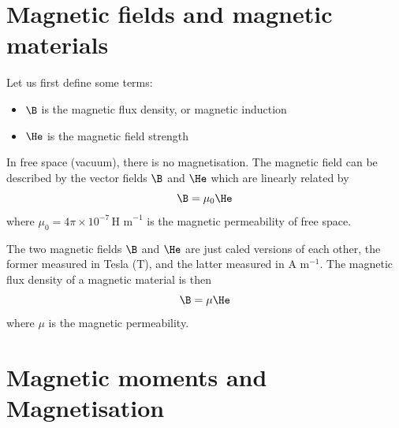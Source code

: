 \documentclass[a4paper, 11pt, normalem]{report}
\begin{document}
\section{Magnetic fields and magnetic materials}
Let us first define some terms:
\begin{itemize}
    \item $\B$ is the magnetic flux density, or magnetic induction
    \item $\He$ is the magnetic field strength
\end{itemize}
In free space (vacuum), there is no magnetisation. 
The magnetic field can be described by the vector fields $\B$ and $\He$ which are linearly related by 
\begin{equation}
    \B = \mu_0 \He
\end{equation}
where $\mu_0 = 4\pi\times10^{-7}\,\text{H m}^{-1}$ is the magnetic permeability of free space.

The two magnetic fields $\B$ and $\He$ are just caled versions of each other, the former measured in Tesla (T), and the latter measured in A m$^{-1}$.
The magnetic flux density of a magnetic material is then 
\begin{equation}
    \B = \mu \He
\end{equation}
where $\mu$ is the magnetic permeability. 

\section{Magnetic moments and Magnetisation}
\end{document}
